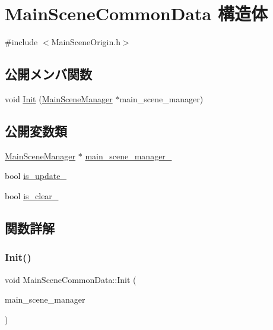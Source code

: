 \hypertarget{struct_main_scene_common_data}{}\section{Main\+Scene\+Common\+Data 構造体}
\label{struct_main_scene_common_data}


{\ttfamily \#include $<$Main\+Scene\+Origin.\+h$>$}

\subsection*{公開メンバ関数}
\begin{DoxyCompactItemize}
\item 
void \mbox{\hyperlink{struct_main_scene_common_data_ada5a4e0b952ac3b4c873b020aa2c3ae2}{Init}} (\mbox{\hyperlink{class_main_scene_manager}{Main\+Scene\+Manager}} $\ast$main\+\_\+scene\+\_\+manager)
\end{DoxyCompactItemize}
\subsection*{公開変数類}
\begin{DoxyCompactItemize}
\item 
\mbox{\hyperlink{class_main_scene_manager}{Main\+Scene\+Manager}} $\ast$ \mbox{\hyperlink{struct_main_scene_common_data_a0019b1b08ade1b4e9f25d6345b3673bc}{main\+\_\+scene\+\_\+manager\+\_\+}}
\item 
bool \mbox{\hyperlink{struct_main_scene_common_data_a1994d7c1d1dc7411e61ed10f3afc6b9a}{is\+\_\+update\+\_\+}}
\item 
bool \mbox{\hyperlink{struct_main_scene_common_data_aedcad9058b4d3b281ca4c991c848fb0d}{is\+\_\+clear\+\_\+}}
\end{DoxyCompactItemize}


\subsection{関数詳解}
\mbox{\label{struct_main_scene_common_data_ada5a4e0b952ac3b4c873b020aa2c3ae2}} 
\subsubsection{\texorpdfstring{Init()}{Init()}}
{\footnotesize\ttfamily void Main\+Scene\+Common\+Data\+::\+Init (\begin{DoxyParamCaption}\item[{\mbox{\hyperlink{class_main_scene_manager}{Main\+Scene\+Manager}} $\ast$}]{main\+\_\+scene\+\_\+manager }\end{DoxyParamCaption})\hspace{0.3cm}{\ttfamily [inline]}}



